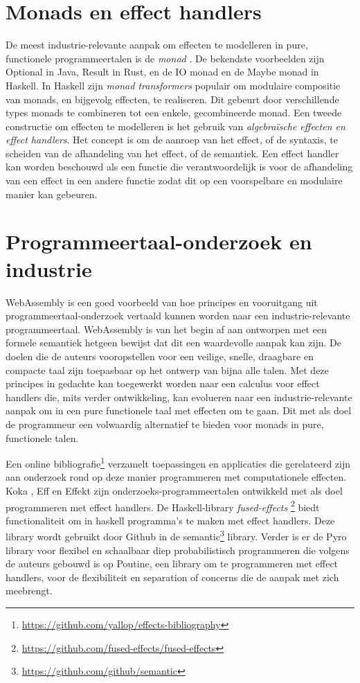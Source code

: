 \section{Monads en effect handlers}
De meest industrie-relevante aanpak om effecten te modelleren in pure, functionele programmeertalen is de \emph{monad} \cite{Moggi1991}. De bekendste voorbeelden zijn Optional in Java, Result in Rust, en de IO monad en de Maybe monad in Haskell. In Haskell zijn \emph{monad transformers}\cite{Liang1995} populair om modulaire compositie van monads, en bijgevolg effecten, te realiseren. Dit gebeurt door verschillende types monads te combineren tot een enkele, gecombineerde monad. \newline 
Een tweede constructie om effecten te modelleren is het gebruik van \emph{algebraïsche effecten \cite{Pretnar2015} en effect handlers}. Het concept is om de aanroep van het effect, of de syntaxis, te scheiden van de afhandeling van het effect, of de semantiek. Een effect handler kan worden beschouwd als een functie die verantwoordelijk is voor de afhandeling van een effect in een andere functie zodat dit op een voorspelbare en modulaire manier kan gebeuren. 

\section{Programmeertaal-onderzoek en industrie}
WebAssembly \cite{Haas2017} is een goed voorbeeld van hoe principes en vooruitgang uit programmeertaal-onderzoek vertaald kunnen worden naar een industrie-relevante programmeertaal. WebAssembly is van het begin af aan ontworpen met een formele semantiek hetgeen bewijst dat dit een waardevolle aanpak kan zijn. De doelen die de auteurs vooropstellen voor een veilige, snelle, draagbare en compacte taal zijn toepasbaar op het ontwerp van bijna alle talen. Met deze principes in gedachte kan toegewerkt worden naar een calculus voor effect handlers die, mits verder ontwikkeling, kan evolueren naar een industrie-relevante aanpak om in een pure functionele taal met effecten om te gaan. Dit met als doel de programmeur een volwaardig alternatief te bieden voor monads in pure, functionele talen. \newline

Een online bibliografie\footnote{\url{https://github.com/yallop/effects-bibliography}} verzamelt toepassingen en applicaties die gerelateerd zijn aan onderzoek rond  op deze manier programmeren met computationele effecten. Koka \cite{Leijen2017}, Eff \cite{Bauer2015} en Effekt \cite{Brachthauser2020} zijn onderzoeks-programmeertalen ontwikkeld met als doel programmeren met effect handlers. De Haskell-library \emph{fused-effects} \footnote{\url{https://github.com/fused-effects/fused-effects}} biedt functionaliteit om in haskell programma's te maken met effect handlers. Deze library wordt gebruikt door Github in de semantic\footnote{\url{https://github.com/github/semantic}} library. Verder is er de Pyro \cite{bingham2019pyro} library voor flexibel en schaalbaar diep probabilistisch programmeren die volgens de auteurs gebouwd is op Poutine, een library om te programmeren met effect handlers, voor de flexibiliteit en separation of concerns die de aanpak met zich meebrengt.

